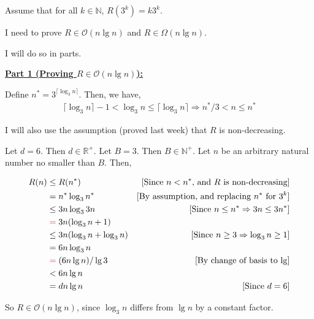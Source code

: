 \documentclass[12pt]{article}
\begin{document}
\begin{itemize}
\begin{mdframed}
    Assume that for all $k \in \mathbb{N}$, $R(3^k) = k3^k$.

    \bigskip

    I need to prove $R \in \mathcal{O}(n \lg n)$ and $R \in \Omega(n \lg n)$.

    \bigskip

    I will do so in parts.

    \bigskip

    \underline{\textbf{Part 1 (Proving $R \in \mathcal{O}(n \lg n)$):}}

    \bigskip

    Define $n^* = 3^{\lceil \log_3 n \rceil}$. Then, we have,
    \setcounter{equation}{0}
    \begin{align}
        \lceil \log_3 n \rceil - 1 < \log_3 n \leq \lceil \log_3 n \rceil \Rightarrow n^*/3 < n \leq n^*
    \end{align}

    I will also use the assumption (proved last week) that $R$ is non-decreasing.

    \bigskip

    Let $d = 6$. Then $d \in \mathbb{R}^+$. Let $B = 3$. Then $B \in \mathbb{N}^+$. Let
    $n$ be an arbitrary natural number no smaller than $B$. Then,

    \bigskip

    \begin{align}
    R(n) &\leq R(n^*)  & [\text{Since $n < n^*$, and $R$ is non-decreasing}]\\
    &= n^* \log_3 n^* & [\text{By assumption, and replacing $n^*$ for $3^k$}]\\
    &\leq 3n \log_3 3n  & [\text{Since $n \leq n^* \Rightarrow 3n \leq 3n^*$}]\\
    &\color{red}=\color{black} 3n(\log_3 n + 1)\\
    &\leq 3n(\log_3 n + \log_3 n) & [\text{Since $n \geq 3 \Rightarrow \log_3 n \geq 1$}]\\
    &= 6n \log_3 n\\
    &\color{red}=\color{black} (6n \lg n)/\lg 3 & [\text{By change of basis to $\lg$}]\\
    &< 6n \lg n\\
    &= dn \lg n & [\text{Since $d = 6$}]
    \end{align}

    \bigskip

    So $R \in \mathcal{O}(n \lg n)$, since $\log_3 n$ differs from $\lg n$ by a constant factor.


\end{mdframed}
\end{itemize}
\end{document}
